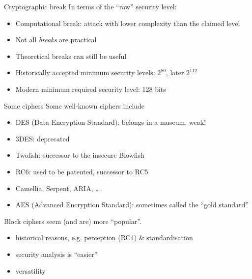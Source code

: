 \begin{frame}{Cryptographic break}
  In terms of the \enquote{raw} security level:
  \begin{itemize}[<+(1)->]
    \item Computational break: attack with lower complexity than the claimed level
    \item Not all \emph{breaks} are practical
    \item Theoretical breaks can still be useful
    \item Historically accepted minimum security levels: $2^{80}$, later $2^{112}$
    \item Modern minimum required security level: 128 bits
  \end{itemize}
\end{frame}

\begin{frame}{Some ciphers}
  Some well-known ciphers include
  \begin{itemize}[<+(1)->]
    \item[\ding{55}] DES (Data Encryption Standard): belongs in a museum, weak!
    \item[\ding{55}] 3DES: deprecated
    \item[\ding{51}] Twofish: successor to the insecure Blowfish
    \item[\ding{51}] RC6: used to be patented, successor to RC5
    \item[\ding{51}] Camellia, Serpent, ARIA, \dots
    \item[\ding{51}]AES (Advanced Encryption Standard): sometimes called the \enquote{gold standard}
  \end{itemize}

  \vspace*{1em}

  \pause
  Block ciphers seem (and are) more \enquote{popular}.
  \begin{itemize}[<+(1)->]
    \item historical reasons, e.g. perception (RC4) \& standardisation
    \item security analysis is \enquote{easier}
    \item versatility
  \end{itemize}
\end{frame}

